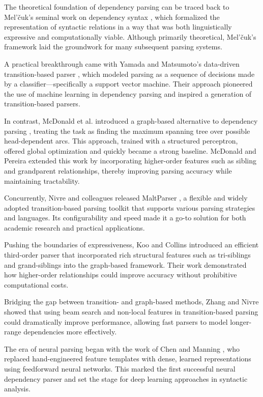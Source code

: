 The theoretical foundation of dependency parsing can be traced back to Mel'čuk's seminal work on dependency syntax \cite{melcuk1988dependency}, which formalized the representation of syntactic relations in a way that was both linguistically expressive and computationally viable. Although primarily theoretical, Mel'čuk's framework laid the groundwork for many subsequent parsing systems.

A practical breakthrough came with Yamada and Matsumoto's data-driven transition-based parser \cite{yamada2003statistical}, which modeled parsing as a sequence of decisions made by a classifier—specifically a support vector machine. Their approach pioneered the use of machine learning in dependency parsing and inspired a generation of transition-based parsers.

In contrast, McDonald et al. introduced a graph-based alternative to dependency parsing \cite{mcdonald2005online}, treating the task as finding the maximum spanning tree over possible head-dependent arcs. This approach, trained with a structured perceptron, offered global optimization and quickly became a strong baseline. McDonald and Pereira \cite{mcdonald2006online} extended this work by incorporating higher-order features such as sibling and grandparent relationships, thereby improving parsing accuracy while maintaining tractability.

Concurrently, Nivre and colleagues released MaltParser \cite{nivre2006maltparser}, a flexible and widely adopted transition-based parsing toolkit that supports various parsing strategies and languages. Its configurability and speed made it a go-to solution for both academic research and practical applications.

Pushing the boundaries of expressiveness, Koo and Collins \cite{koo2010efficient} introduced an efficient third-order parser that incorporated rich structural features such as tri-siblings and grand-siblings into the graph-based framework. Their work demonstrated how higher-order relationships could improve accuracy without prohibitive computational costs.

Bridging the gap between transition- and graph-based methods, Zhang and Nivre \cite{zhang2011transition} showed that using beam search and non-local features in transition-based parsing could dramatically improve performance, allowing fast parsers to model longer-range dependencies more effectively.

The era of neural parsing began with the work of Chen and Manning \cite{chen2014fast}, who replaced hand-engineered feature templates with dense, learned representations using feedforward neural networks. This marked the first successful neural dependency parser and set the stage for deep learning approaches in syntactic analysis.

